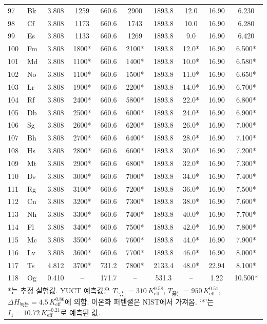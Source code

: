 \documentclass[11pt,a4paper]{article}
\begin{document}
\begin{longtable}{@{}llcccccccc@{}}
		97 & Bk  & 3.808 & 1259   & 660.6  & 2900   & 1893.8 & 12.0  & 16.90 & 6.230 \\
		98 & Cf  & 3.808 & 1173   & 660.6  & 1743   & 1893.8 & 10.0  & 16.90 & 6.280 \\
		99 & Es  & 3.808 & 1133   & 660.6  & 1269   & 1893.8 & 9.0   & 16.90 & 6.420 \\
		100& Fm  & 3.808 & 1800*  & 660.6  & 2100*  & 1893.8 & 12.0* & 16.90 & 6.500* \\
		101& Md  & 3.808 & 1100*  & 660.6  & 1400*  & 1893.8 & 10.0* & 16.90 & 6.580* \\
		102& No  & 3.808 & 1100*  & 660.6  & 1500*  & 1893.8 & 11.0* & 16.90 & 6.650* \\
		103& Lr  & 3.808 & 1900*  & 660.6  & 2200*  & 1893.8 & 14.0* & 16.90 & 6.700* \\
		104& Rf  & 3.808 & 2400*  & 660.6  & 5800*  & 1893.8 & 22.0* & 16.90 & 6.800* \\
		105& Db  & 3.808 & 2500*  & 660.6  & 6000*  & 1893.8 & 24.0* & 16.90 & 6.900* \\
		106& Sg  & 3.808 & 2600*  & 660.6  & 6200*  & 1893.8 & 26.0* & 16.90 & 7.000* \\
		107& Bh  & 3.808 & 2700*  & 660.6  & 6400*  & 1893.8 & 28.0* & 16.90 & 7.100* \\
		108& Hs  & 3.808 & 2800*  & 660.6  & 6600*  & 1893.8 & 30.0* & 16.90 & 7.200* \\
		109& Mt  & 3.808 & 2900*  & 660.6  & 6800*  & 1893.8 & 32.0* & 16.90 & 7.300* \\
		110& Ds  & 3.808 & 3000*  & 660.6  & 7000*  & 1893.8 & 34.0* & 16.90 & 7.400* \\
		111& Rg  & 3.808 & 3100*  & 660.6  & 7200*  & 1893.8 & 36.0* & 16.90 & 7.500* \\
		112& Cn  & 3.808 & 3200*  & 660.6  & 7300*  & 1893.8 & 38.0* & 16.90 & 7.600* \\
		113& Nh  & 3.808 & 3300*  & 660.6  & 7400*  & 1893.8 & 40.0* & 16.90 & 7.700* \\
		114& Fl  & 3.808 & 3400*  & 660.6  & 7500*  & 1893.8 & 42.0* & 16.90 & 7.800* \\
		115& Mc  & 3.808 & 3500*  & 660.6  & 7600*  & 1893.8 & 44.0* & 16.90 & 7.900* \\
		116& Lv  & 3.808 & 3600*  & 660.6  & 7700*  & 1893.8 & 46.0* & 16.90 & 8.000* \\
		117& Ts  & 4.812 & 3700*  & 731.2  & 7800*  & 2133.4 & 48.0* & 22.94 & 8.100* \\
		118& Og  & 0.410 & --     & 171.7  & --     & 531.3  & --    & 1.22  & 10.500* \\
		\bottomrule
		\multicolumn{10}{p{0.9\textwidth}}{\footnotesize
			*는 추정 실험값. YUCT 예측값은 \(T_{\text{녹는}}=310\,K_{\mathrm{eff}}^{0.58}\), 
			\(T_{\text{끓는}}=950\,K_{\mathrm{eff}}^{0.51}\), 
			\(\Delta H_{\text{녹는}}=4.5\,K_{\mathrm{eff}}^{0.86}\)에 의함.  
			이온화 퍼텐셜은 NIST에서 가져옴. `*'는 \(I_1 = 10.72\,K_{\mathrm{eff}}^{-0.21}\)로 예측된 값.}
	\end{longtable}
	
\end{document}
